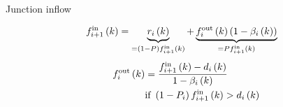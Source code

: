 \documentclass[xcolor=svgnames, english, smaller]{beamer}
\theoremstyle{plain}
\theoremstyle{definition}
\theoremstyle{plain}
\theoremstyle{plain}
\newcommand \Fontvi{\fontsize{8}{8}\selectfont}
\newcommand \systemDiagOffset{-1.8in}
\newcommand \systemDiagResizeMult{1.3}
\begin{document}
\begin{frame}{Junction inflow}

\Fontvi

\begin{figure}[t]
\hspace{\systemDiagOffset}
\resizebox{\systemDiagResizeMult\columnwidth}{!}{}
\label{fig:system}
\end{figure}

\begin{minipage}[t]{0.46\linewidth}
\begin{figure}[h]
\centering
\resizebox{0.8\columnwidth}{!}{
	
}
\label{fig:junctionBuffer-junctionFlowsInside}
\end{figure}
\end{minipage}\hfill
\begin{minipage}[t]{0.50\linewidth}
\begin{align}
&& f_{i+1}^{\text{in}}\left(k\right) & =  \underbrace{r_{i}\left(k\right)}_{=(1-P)f_{i+1}^{\text{in}}\left(k\right)} + \underbrace{f_{i}^{\text{out}}\left(k\right)\left(1-\beta_{i}\left(k\right)\right)}_{=Pf_{i+1}^{\text{in}}\left(k\right)}& \nonumber
\end{align}
\pause \begin{align}
&& f_{i}^{\text{out}}\left(k\right) &= \frac{f_{i+1}^{\text{in}}\left(k\right)-d_{i}\left(k\right)}{1-\beta_{i}\left(k\right)} \nonumber \\
&& &\text{if } \left(1-P_{i}\right)f_{i+1}^{\text{in}}\left(k\right) > d_{i}\left(k\right) \nonumber
\end{align}
\end{minipage}
\end{frame}
\end{document}
